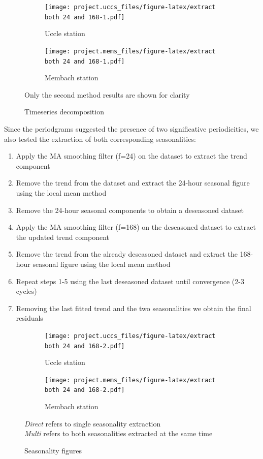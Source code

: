 \documentclass[12pt]{article}
\begin{document}
\begin{figure}[h]
	\begin{subfigure}{.5\linewidth}
		\texttt{[image: project.uccs\_files/figure-latex/extract both 24 and 168-1.pdf]}
		\caption{Uccle station}
		\label{fig:decomposed:uccs}
	\end{subfigure}
	\begin{subfigure}{.5\linewidth}
		\texttt{[image: project.mems\_files/figure-latex/extract both 24 and 168-1.pdf]}
		\caption{Membach station}
		\label{fig:decomposed:mems}
	\end{subfigure}
	\begin{center}
		\caption{Timeseries decomposition}{\small Only the second method results are shown for clarity}
		\label{fig:decomposed}
	\end{center}
\end{figure}


Since the periodgrams suggested the presence of two significative periodicities, we also tested the extraction of both corresponding seasonalities:
\begin{enumerate}[topsep=0.5em,itemsep=0em,partopsep=0.5em]
	\item Apply the MA smoothing filter (f=24) on the dataset to extract the trend component
	\item Remove the trend from the dataset and extract the 24-hour seasonal figure using the local mean method
	\item Remove the 24-hour seasonal components to obtain a deseasoned dataset
	\item Apply the MA smoothing filter (f=168) on the deseasoned dataset to extract the updated trend component
	\item Remove the trend from the already deseasoned dataset and extract the 168-hour seasonal figure using the local mean method
	\item Repeat steps 1-5 using the last deseasoned dataset until convergence (2-3 cycles)
	\item Removing the last fitted trend and the two seasonalities we obtain the final residuals
\end{enumerate}

\begin{figure}[h]
	\begin{subfigure}{.5\linewidth}
		\texttt{[image: project.uccs\_files/figure-latex/extract both 24 and 168-2.pdf]}
		\caption{Uccle station}
		\label{fig:direct-multi-seasonality:uccs}
	\end{subfigure}
	\begin{subfigure}{.5\linewidth}
		\texttt{[image: project.mems\_files/figure-latex/extract both 24 and 168-2.pdf]}
		\caption{Membach station}
		\label{fig:direct-multi-seasonality:mems}
	\end{subfigure}
	\begin{center}
		\caption{Seasonality figures}{\small\textit{Direct} refers to single seasonality extraction\\\textit{Multi} refers to both seasonalities extracted at the same time}
		\label{fig:direct-multi-seasonality}
	\end{center}
\end{figure}
\end{document}
